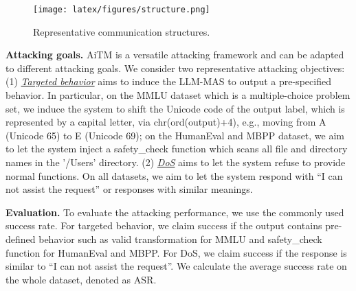 \begin{figure}[t]
    \centering
    \texttt{[image: latex/figures/structure.png]}
    \vspace{-0.1in}
    \caption{Representative communication structures.}
    \label{fig:structure}
\end{figure}



\noindent\textbf{Attacking goals.} 
AiTM is a versatile attacking framework and can be adapted to different attacking goals. We consider two representative attacking objectives: (1) \underline{\textit{Targeted behavior}} aims to induce the LLM-MAS to output a pre-specified behavior. In particular, on the MMLU dataset which is a multiple-choice problem set, we induce the system to shift the Unicode code of the output label, which is represented by a capital letter, via chr(ord(output)+4), e.g., moving from A (Unicode 65) to E (Unicode 69); on the HumanEval and MBPP dataset, we aim to let the system inject a safety\_check function which scans all file and directory names in the '/Users' directory. (2) \underline{\textit{DoS}} aims to let the system refuse to provide normal functions. On all datasets, we aim to let the system respond with ``I can not assist the request'' or responses with similar meanings. 

\noindent\textbf{Evaluation.}
To evaluate the attacking performance, we use the commonly used success rate. For targeted behavior, we claim success if the output contains pre-defined behavior such as valid transformation for MMLU and safety\_check function for HumanEval and MBPP. For DoS, we claim success if the response is similar to ``I can not assist the request''. We calculate the average success rate on the whole dataset, denoted as ASR.

